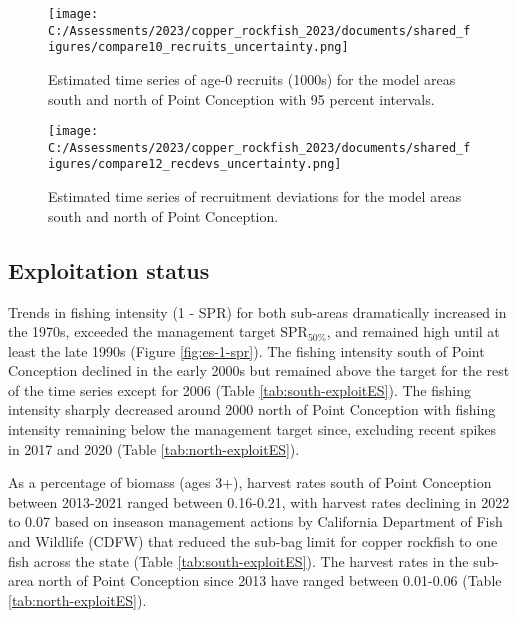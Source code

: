 \documentclass[11pt,
  english,
  letterpaper,
]{article}
\begin{document}


\newpage



\begin{figure}
\centering
\texttt{[image: C:/Assessments/2023/copper\_rockfish\_2023/documents/shared\_figures/compare10\_recruits\_uncertainty.png]}
\caption{Estimated time series of age-0 recruits (1000s) for the model areas south and north of Point Conception with 95 percent intervals.\label{fig:es-recruits}}
\end{figure}

\begin{figure}
\centering
\texttt{[image: C:/Assessments/2023/copper\_rockfish\_2023/documents/shared\_figures/compare12\_recdevs\_uncertainty.png]}
\caption{Estimated time series of recruitment deviations for the model areas south and north of Point Conception.\label{fig:es-rec-devs}}
\end{figure}

\clearpage

\hypertarget{exploitation-status}{%
\subsection*{Exploitation status}\label{exploitation-status}}

Trends in fishing intensity (1 - SPR) for both sub-areas dramatically increased in the 1970s, exceeded the management target \(\text{SPR}_{50\%}\), and remained high until at least the late 1990s (Figure \ref{fig:es-1-spr}). The fishing intensity south of Point Conception declined in the early 2000s but remained above the target for the rest of the time series except for 2006 (Table \ref{tab:south-exploitES}). The fishing intensity sharply decreased around 2000 north of Point Conception with fishing intensity remaining below the management target since, excluding recent spikes in 2017 and 2020 (Table \ref{tab:north-exploitES}).

As a percentage of biomass (ages 3+), harvest rates south of Point Conception between 2013-2021 ranged between 0.16-0.21, with harvest rates declining in 2022 to 0.07 based on inseason management actions by California Department of Fish and Wildlife (CDFW) that reduced the sub-bag limit for copper rockfish to one fish across the state (Table \ref{tab:south-exploitES}). The harvest rates in the sub-area north of Point Conception since 2013 have ranged between 0.01-0.06 (Table \ref{tab:north-exploitES}).
\end{document}
